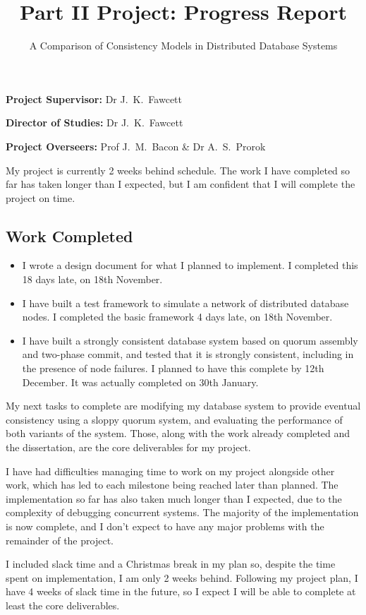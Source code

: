 \documentclass[12pt,a4paper]{article}
\title{Part II Project: Progress Report}
\author{A Comparison of Consistency Models in Distributed Database Systems}
\date{}
\begin{document}
\maketitle
\thispagestyle{fancy}

\noindent
{\bf Project Supervisor:} Dr J.~K.~Fawcett
\vspace{0.2in}

\noindent
{\bf Director of Studies:} Dr J.~K.~Fawcett
\vspace{0.2in}
\noindent

\noindent
{\bf Project Overseers:} Prof J.~M.~Bacon \& Dr A.~S.~Prorok

\vspace{0.2in}

My project is currently 2 weeks behind schedule. The work I have completed so far has taken longer than I expected, but I am confident that I will complete the project on time.

\subsection*{Work Completed}

\begin{itemize}
  \item
  I wrote a design document for what I planned to implement. I completed this 18 days late, on 18th November.

  \item
  I have built a test framework to simulate a network of distributed database nodes. I completed the basic framework 4 days late, on 18th November.

  \item
  I have built a strongly consistent database system based on quorum assembly and two-phase commit, and tested that it is strongly consistent, including in the presence of node failures. I planned to have this complete by 12th December. It was actually completed on 30th January.

\end{itemize}

My next tasks to complete are modifying my database system to provide eventual consistency using a sloppy quorum system, and evaluating the performance of both variants of the system. Those, along with the work already completed and the dissertation, are the core deliverables for my project.

I have had difficulties managing time to work on my project alongside other work, which has led to each milestone being reached later than planned. The implementation so far has also taken much longer than I expected, due to the complexity of debugging concurrent systems. The majority of the implementation is now complete, and I don't expect to have any major problems with the remainder of the project.

I included slack time and a Christmas break in my plan so, despite the time spent on implementation, I am only 2 weeks behind. Following my project plan, I have 4 weeks of slack time in the future, so I expect I will be able to complete at least the core deliverables.
\end{document}

